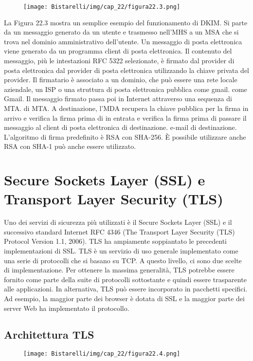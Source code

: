 \begin{figure}[H]
	\centering
    \texttt{[image: Bistarelli/img/cap\_22/figura22.3.png]}
\end{figure}

La Figura 22.3 mostra un semplice esempio del funzionamento di DKIM. Si parte da un messaggio generato da un utente e trasmesso nell'MHS a un MSA che si trova nel dominio amministrativo dell'utente. Un messaggio di posta elettronica viene generato da un programma client di posta elettronica. Il contenuto del messaggio, più le intestazioni RFC 5322 selezionate, è firmato dal provider di posta elettronica dal provider di posta elettronica utilizzando la chiave privata del provider. Il firmatario è associato a un dominio, che può essere una rete locale aziendale, un ISP o una struttura di posta elettronica pubblica come gmail. come Gmail. Il messaggio firmato passa poi in Internet attraverso una sequenza di MTA. di MTA. A destinazione, l'MDA recupera la chiave pubblica per la firma in arrivo e verifica la firma prima di in entrata e verifica la firma prima di passare il messaggio al client di posta elettronica di destinazione. e-mail di destinazione. L'algoritmo di firma predefinito è RSA con SHA-256. È possibile utilizzare anche RSA con SHA-1 può anche essere utilizzato.
\section{Secure Sockets Layer (SSL) e Transport Layer Security (TLS)}
Uno dei servizi di sicurezza più utilizzati è il Secure Sockets Layer (SSL) e il successivo standard Internet RFC 4346 (The Transport Layer Security (TLS) Protocol Version 1.1, 2006). TLS ha ampiamente soppiantato le precedenti implementazioni di SSL. TLS è un servizio di uso generale implementato come una serie di protocolli che si basano su TCP. A questo livello, ci sono due scelte di implementazione. Per ottenere la massima generalità, TLS potrebbe essere fornito come parte della suite di protocolli sottostante e quindi essere trasparente alle applicazioni. In alternativa, TLS può essere incorporato in pacchetti specifici. Ad esempio, la maggior parte dei browser è dotata di SSL e la maggior parte dei server Web ha implementato il protocollo.
\subsection{Architettura TLS}

\begin{figure}[H]
	\centering
    \texttt{[image: Bistarelli/img/cap\_22/figura22.4.png]}
\end{figure}

